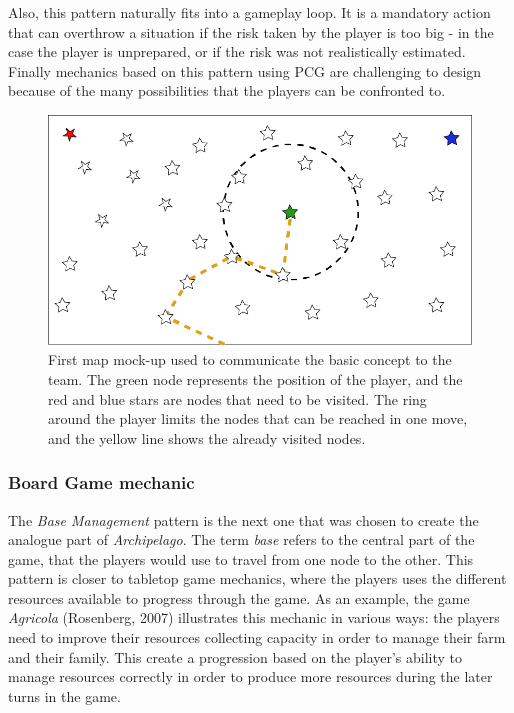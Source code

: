 Also, this pattern naturally fits into a gameplay loop. It is a mandatory action that can overthrow a situation if the risk taken by the player is too big - in the case the player is unprepared, or if the risk was not realistically estimated. Finally mechanics based on this pattern using PCG are challenging to design because of the many possibilities that the players can be confronted to. 
\begin{figure}[h]
    \centering
    \includegraphics[scale=0.25]{Images/Map.png}
    \caption{First map mock-up used to communicate the basic concept to the team. The green node represents the position of the player, and the red and blue stars are nodes that need to be visited. The ring around the player limits the nodes that can be reached in one move, and the yellow line shows the already visited nodes.}
    \label{fig:map}
\end{figure}
\subsubsection{Board Game mechanic}
The \textit{Base Management} pattern is the next one that was chosen to create the analogue part of \textit{Archipelago}. The term \textit{base} refers to the central part of the game, that the players would use to travel from one node to the other. This pattern is closer to tabletop game mechanics, where the players uses the different resources available to progress through the game. As an example, the game \textit{Agricola} (Rosenberg, 2007) \cite{game:agri} illustrates this mechanic in various ways: the players need to improve their resources collecting capacity in order to manage their farm and their family. This create a progression based on the player's ability to manage resources correctly in order to produce more resources during the later turns in the game.

